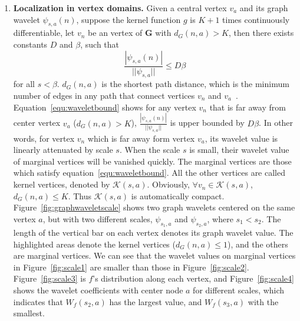 \begin{enumerate}
\item \textbf{Localization in vertex domains.} Given a central vertex $v_a$ and its graph wavelet $\psi_{s,a}(n)$, suppose the kernel function $g$ is $K+1$ times continuously differentiable, let $v_n$ be an vertex of $\mathbf{G}$ with $d_G(n,a)>K$, then there exists constants $D$ and $\beta$, such that
\begin{equation}
\label{equ:waveletbound}
\frac{|\psi_{s,a}(n)|}{||\psi_{s,a}||}\leq D \beta
\end{equation} for all $s<\beta$.
$d_G(n,a)$ is the shortest path distance, which is the minimum number of edges in any path that connect vertices $v_n$ and $v_a$~\cite{hammond2011wavelets}. Equation~\ref{equ:waveletbound} shows for any vertex $v_n$ that is far away from center vertex $v_a$ ($d_G(n,a)>K$), $\frac{|\psi_{s,a}(n)|}{||\psi_{s,a}||}$ is upper bounded by $D\beta$. In other words, for vertex $v_n$ which is far away form vertex $v_a$, its wavelet value is linearly attenuated by scale $s$.  When the scale $s$ is small, their wavelet value of marginal vertices will be vanished quickly. The marginal vertices are those which satisfy equation~\ref{equ:waveletbound}. All the other vertices are called kernel vertices, denoted by $\mathcal{K}(s,a)$. Obviously, $\forall v_n \in \mathcal{K}(s,a)$,  $d_G(n,a)\le K$. Thus $\mathcal{K}(s,a)$ is automatically compact.
Figure~\ref{fig:graphwaveletscale} shows two graph wavelets centered on the same vertex $a$, but with two different scales, $\psi_{s_1,a}$ and $\psi_{s_2, a}$, where $s_1<s_2$. The length of the vertical bar on each vertex denotes its graph wavelet value. The highlighted areas denote the kernel vertices ($d_G(n,a)\le 1$), and the others are marginal vertices. We can see that the wavelet values on marginal vertices in Figure~\ref{fig:scale1} are smaller than those in Figure~\ref{fig:scale2}. Figure~\ref{fig:scale3} is $f$'s distribution along each vertex, and Figure~\ref{fig:scale4} shows the wavelet coefficients with center node $a$ for different scales, which indicates that
$W_f(s_2,a)$ has the largest value, and $W_f(s_3,a)$ with the smallest.
 \end{enumerate}






